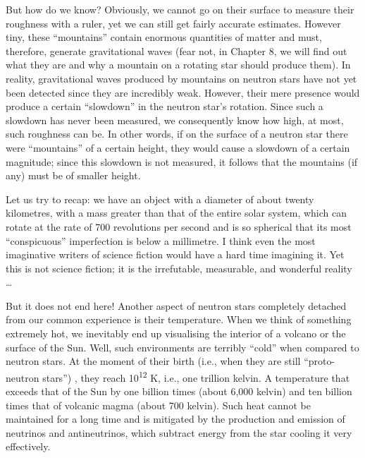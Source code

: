 But how do we know? Obviously, we cannot go on their surface to measure their roughness
with a ruler, yet we can still get fairly accurate estimates. However tiny, these
``mountains'' contain enormous quantities of matter and must, therefore, generate
gravitational waves (fear not, in Chapter 8, we will find out what
they are and why a mountain on a rotating star should produce them). In reality,
gravitational waves produced by mountains on neutron stars have not
yet been detected since they are incredibly weak. However, their mere presence would
produce a certain ``slowdown'' in the neutron star's rotation. Since such a slowdown has
never been measured, we consequently know how high, at most, such roughness can be. In
other words, if on the surface of a neutron star there were ``mountains''
of a certain height, they would cause a slowdown of a certain
magnitude; since this slowdown is not measured, it follows that the mountains (if any)
must be of smaller height.

Let us try to recap: we have an object with a diameter of about twenty kilometres, with
a mass greater than that of the entire solar system, which can rotate at the rate of 700
revolutions per second and is so spherical that its most ``conspicuous'' imperfection is
below a millimetre. I think even the most imaginative writers of science fiction would
have a hard time imagining it. Yet this is not science fiction; it is the irrefutable,
measurable, and wonderful reality \ldots{}

But it does not end here! Another aspect of neutron stars completely detached from our
common experience is their temperature. When we think of something extremely hot, we
inevitably end up visualising the interior of a volcano or the surface of the Sun. Well,
such environments are terribly ``cold'' when compared to neutron
stars. At the moment of their birth (i.e., when they are still
``proto-neutron stars'') , they reach 10\textsuperscript{12} K, i.e.,
one trillion kelvin. A temperature that exceeds that of the Sun by one billion times
(about 6,000 kelvin) and ten billion times that of volcanic magma (about 700 kelvin).
Such heat cannot be maintained for a long time and is mitigated by the production and
emission of neutrinos and antineutrinos, which
subtract energy from the star cooling it very effectively.

